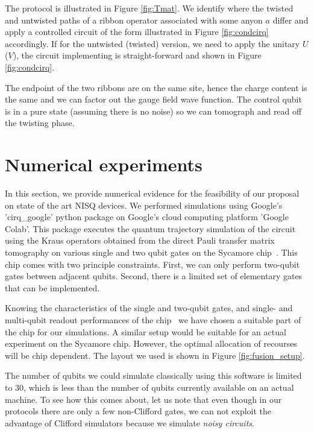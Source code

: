 \documentclass[a4paper,twocolumn,11pt]{quantumarticle}
\begin{document}
The protocol is illustrated in Figure \ref{fig:Tmat}. We identify where the twisted and untwisted paths of a ribbon operator associated with some anyon $a$ differ and apply a controlled circuit of the form illustrated in Figure \ref{fig:condcirq} accordingly. If for the untwisted (twisted) version, we need to apply the unitary $U$ ($V$), the circuit implementing is straight-forward and shown in Figure \ref{fig:condcirq}.

The endpoint of the two ribbons are on the same site, hence the charge content is the same and we can factor out the gauge field wave function. 
The control qubit is in a pure state (assuming there is no noise) so we can tomograph and read off the twisting phase.


\section{Numerical experiments}\label{sec:num}

In this section, we provide numerical evidence for the feasibility of our proposal on state of the art NISQ devices. We performed simulations using Google's 'cirq\_google' python package on Google's cloud computing platform 'Google Colab'. This package executes the quantum trajectory simulation of the circuit using the Kraus operators obtained from the direct Pauli transfer matrix tomography on various single and two qubit gates on the Sycamore chip~\cite{weber}. This chip comes with two principle constraints. First, we can only perform two-qubit gates between adjacent qubits. Second, there is a limited set of elementary gates that can be implemented. 


Knowing the characteristics of the single and two-qubit gates, and single- and multi-qubit readout performances of the chip~\cite{weber} we have chosen a suitable part of the chip for our simulations. A similar setup would be suitable for an actual experiment on the Sycamore chip. However, the optimal allocation of recourses will be chip dependent. The layout we used is shown in Figure \ref{fig:fusion_setup}.


The number of qubits we could simulate classically using this software is limited to 30, which is less than the number of qubits currently available on an actual machine. To see how this comes about, let us note that even though in our protocols there are only a few non-Clifford gates, we can not exploit the advantage of Clifford simulators because we simulate \emph{noisy circuits}. 
\end{document}

